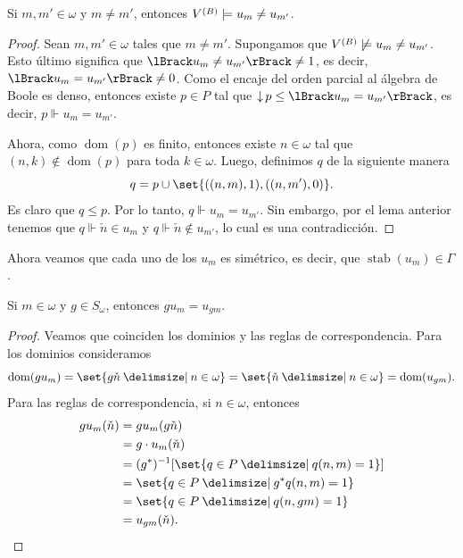 \documentclass[letterpaper,DIV=15,12pt]{scrartcl}
\DeclarePairedDelimiter{\vb}{\lBrack}{\rBrack}             %
\DeclareMathOperator{\dom}{dom}                            %
\DeclareMathOperator{\stab}{stab}                          %
\DeclareMathOperator{\abajo}{\downarrow}                   %
\newcommand{\st}{}
\newcommand{\SetSymbol}[1][]{%
\nonscript\:#1\vert
\allowbreak
\nonscript\:
\mathopen{}}
\renewcommand\st{\SetSymbol[\delimsize]}
\begin{document}
\begin{lemma}[label=lema:ums]
    Si \(m,m'\in\omega\) y \(m\ne m'\), entonces \(\mb\models u_m\ne u_{m'}\).
\end{lemma}
\begin{proof}
    Sean \(m,m'\in\omega\) tales que \(m\ne m'\). Supongamos que
    \(\mb\not\models u_m\ne u_{m'}\). Esto último significa que
    \(\vb{u_m\ne u_{m'}}\ne 1\), es decir, \(\vb{u_m=u_{m'}}\ne 0\). Como el
    encaje del orden parcial al álgebra de Boole es denso, entonces existe
    \(p\in P\) tal que \(\abajo p\leq\vb{u_m=u_{m'}}\), es decir, 
    \(p\Vdash u_m=u_{m'}\).

    Ahora, como \(\dom(p)\) es finito, entonces existe \(n\in\omega\) tal que
    \((n,k)\notin\dom(p)\) para toda \(k\in\omega\). Luego, definimos \(q\) de
    la siguiente manera
    \begin{equation*}
        q = p\cup\set{((n,m),1),((n,m'),0)}.
    \end{equation*}
    Es claro que \(q\leq p\). Por lo tanto, \(q\Vdash u_m=u_{m'}\). Sin embargo,
    por el lema anterior tenemos que \(q\Vdash\check{n}\in u_m\) y
    \(q\Vdash\check{n}\notin u_{m'}\), lo cual es una contradicción.
\end{proof}

Ahora veamos que cada uno de los \(u_m\) es simétrico, es decir, que
\(\stab(u_m)\in\Gamma\).

\begin{lemma}[label=lema:gum]
    Si \(m\in\omega\) y \(g\in S_{\omega}\), entonces \(g u_m=u_{gm}\).
\end{lemma}
\begin{proof}
    Veamos que coinciden los dominios y las reglas de correspondencia. Para los
    dominios consideramos
    \begin{equation*}
        \dom(gu_m)=\set{g\check{n}\st n\in\omega}
        =\set{\check{n}\st n\in\omega}=\dom(u_{gm}).
    \end{equation*}
    Para las reglas de correspondencia, si \(n\in\omega\), entonces
    \begin{align*}
        gu_m(\check{n}) & =gu_m(g\check{n}) \\
        & =g\cdot u_m(\check{n}) \\
        & =(g^*)^{-1}[\set{q\in P\st q(n,m)=1}] \\
        & =\set{q\in P\st g^*q(n,m)=1} \\
        & =\set{q\in P\st q(n,gm)=1} \\
        & =u_{gm}(\check{n}).
        \qedhere
    \end{align*}
\end{proof}
\end{document}
